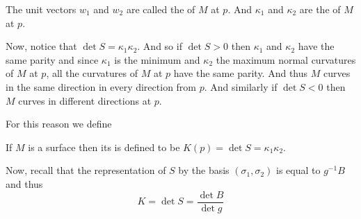 \begin{defn*}

    The unit vectors $w_1$ and $w_2$ are called the  of $M$ at $p$.
    And $\kappa_1$ and $\kappa_2$ are the  of $M$ at $p$.

\end{defn*}

Now, notice that $\det S=\kappa_1\kappa_2$.
And so if $\det S>0$ then $\kappa_1$ and $\kappa_2$ have the same parity and since $\kappa_1$ is the minimum and $\kappa_2$ the maximum normal curvatures of $M$ at $p$, all the curvatures of $M$ at $p$ have
the same parity.
And thus $M$ curves in the same direction in every direction from $p$.
And similarly if $\det S<0$ then $M$ curves in different directions at $p$.

For this reason we define

\begin{defn*}

    If $M$ is a surface then its  is defined to be $K(p)=\det S=\kappa_1\kappa_2$.

\end{defn*}

Now, recall that the representation of $S$ by the basis $(\sigma_1,\sigma_2)$ is equal to $g^{-1}B$ and thus
\[ K = \det S = \frac{\det B}{\det g} \]

